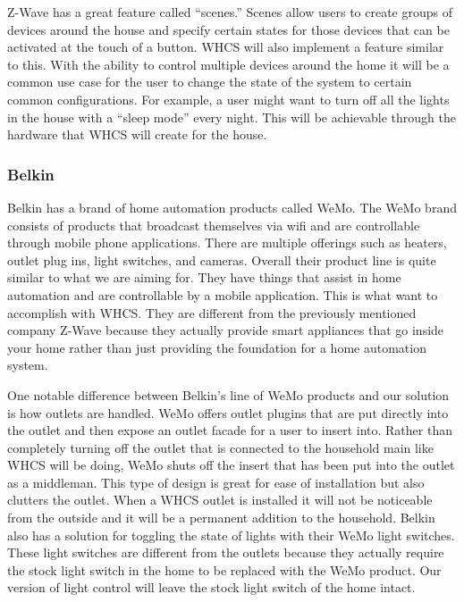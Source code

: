 {\color{black}
Z{}-Wave has a great feature called {}``scenes.'' Scenes allow users to create groups of devices around the house and
specify certain states for those devices that can be activated at the touch of a button. WHCS will also implement a
feature similar to this. With the ability to control multiple devices around the home it will be a common use case for
the user to change the state of the system to certain common configurations. For example, a user might want to turn off
all the lights in the house with a {}``sleep mode{}'' every night. This will be achievable through the hardware that
WHCS will create for the house.}

\subsubsection{Belkin}
Belkin has a brand of home automation products called WeMo. The WeMo brand
consists of products that broadcast themselves via wifi and are controllable
through mobile phone applications. There are multiple offerings such as
heaters, outlet plug ins, light switches, and cameras. Overall their product
line is quite similar to what we are aiming for. They have things that assist
in home automation and are controllable by a mobile application. This is what
want to accomplish with WHCS. They are different from the previously mentioned
company Z{}-Wave because they actually provide smart appliances that go inside
your home rather than just providing the foundation for a home automation
system.

One notable difference between Belkin{}'s line of WeMo products
and our solution is how outlets are handled. WeMo offers outlet plugins that
are put directly into the outlet and then expose an outlet facade for a user to
insert into. Rather than completely turning off the outlet that is connected to
the household main like WHCS will be doing, WeMo shuts off the insert that has
been put into the outlet as a middleman. This type of design is great for ease
of installation but also clutters the outlet. When a WHCS outlet is installed
it will not be noticeable from the outside and it will be a permanent addition
to the household. Belkin also has a solution for toggling the state of lights
with their WeMo light switches. These light switches are different from the
outlets because they actually require the stock light switch in the home to be
replaced with the WeMo product. Our version of light control will leave the
stock light switch of the home intact.

